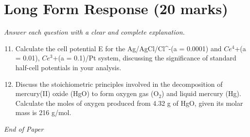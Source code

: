\documentclass[12pt]{article}
\begin{document}
\section*{Long Form Response (20 marks)}
\textit{Answer each question with a clear and complete explanation.}
\begin{enumerate}[label=\arabic*.]
\setcounter{enumi}{10}
\item Calculate the cell potential E for the Ag/AgCl/Cl^-(a = 0.0001) and $Ce^4$+(a = 0.01), $Ce^3$+(a = 0.1)/Pt system, discussing the significance of standard half-cell potentials in your analysis.
\item Discuss the stoichiometric principles involved in the decomposition of mercury(II) oxide (HgO) to form oxygen gas (O$_{2}$) and liquid mercury (Hg). Calculate the moles of oxygen produced from 4.32 g of HgO, given its molar mass is 216 g/mol.
\end{enumerate}

\vfill
\noindent\textit{End of Paper}
\end{document}
